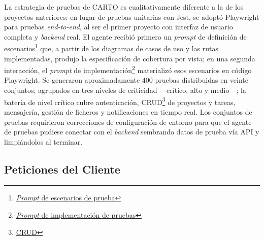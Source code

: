 La estrategia de pruebas de \ac{CARTO} es cualitativamente diferente a la de los proyectos anteriores: en lugar de pruebas unitarias con Jest, se adoptó Playwright para pruebas \textit{end-to-end}, al ser el primer proyecto con interfaz de usuario completa y \textit{backend} real. El agente recibió primero un \textit{prompt} de definición de escenarios\footnote{\href{https://github.com/alu0101549491/TFG-Fabian-Gonzalez-Lence/blob/main/resources/prompts/4-CartographicProjectManager/5-TestingDeLaAplicacion/test-scenarios.prompt.md}{\textit{Prompt} de escenarios de prueba}} que, a partir de los diagramas de casos de uso y las rutas implementadas, produjo la especificación de cobertura por vista; en una segunda interacción, el \textit{prompt} de implementación\footnote{\href{https://github.com/alu0101549491/TFG-Fabian-Gonzalez-Lence/blob/main/resources/prompts/4-CartographicProjectManager/5-TestingDeLaAplicacion/test-implementations.prompt.md}{\textit{Prompt} de implementación de pruebas}} materializó esos escenarios en código Playwright. Se generaron aproximadamente 400 pruebas distribuidas en veinte conjuntos, agrupados en tres niveles de criticidad ---crítico, alto y medio---; la batería de nivel crítico cubre autenticación, CRUD\footnote{\href{https://es.wikipedia.org/wiki/CRUD}{CRUD}} de proyectos y tareas, mensajería, gestión de ficheros y notificaciones en tiempo real. Los conjuntos de pruebas requirieron correcciones de configuración de entorno para que el agente de pruebas pudiese conectar con el \textit{backend} sembrando datos de prueba vía \ac{API} y limpiándolos al terminar.

\subsection{Peticiones del Cliente}

